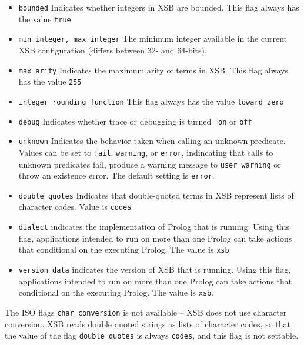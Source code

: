 \begin{description}
\begin{itemize}
\item {\tt bounded} Indicates whether integers in XSB are bounded.
  This flag always has the value {\tt true}
%
\item {\tt min\_integer, max\_integer} The minimum integer available in the current
  XSB configuration (differs between 32- and 64-bits).
%
\item {\tt max\_arity} Indicates the maximum arity of terms in XSB.
  This flag always has the value {\tt 255}
%
\item {\tt integer\_rounding\_function} This flag always has the value
  {\tt toward\_zero}
%
\item {\tt debug} Indicates whether trace or debugging is turned {\tt
  on} or {\tt off}
%
\item {\tt unknown} Indicates the behavior taken when calling an
  unknown predicate.  Values can be set to {\tt fail}, {\tt warning},
  or {\tt error}, indincating that calls to unknown predicates fail,
  produce a warning message to {\tt user\_warning} or throw an
  existence error.  The default setting is {\tt error}.
%
\item {\tt double\_quotes} Indicates that double-quoted terms in XSB
  represent lists of character codes.  Value is {\tt codes}
%
\item {\tt dialect} indicates the implementation of Prolog that is
  running.  Using this flag, applications intended to run on more than
  one Prolog can take actions that conditional on the executing
  Prolog.  The value is {\tt xsb}.

\item {\tt version\_data} indicates the version of XSB that is
  running.  Using this flag, applications intended to run on more than
  one Prolog can take actions that conditional on the executing
  Prolog.  The value is {\tt xsb}.
\end{itemize}

\compatibility The ISO flags {\tt char\_conversion} is not available
-- XSB does not use character conversion.  XSB reads double quoted
strings as lists of character codes, so that the value of the flag
{\tt double\_quotes} is always {\tt codes}, and this flag is not
settable.


\end{description}
